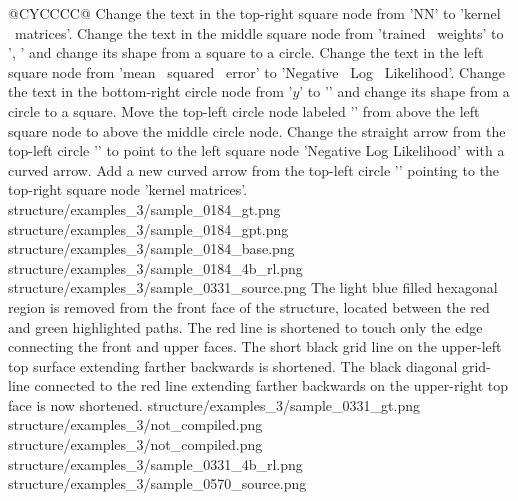 \begin{table}[t]
\begin{tabularx}{\textwidth}{@{}CYCCCC@{}}
    {Change the text in the top-right square node from 'NN' to 'kernel \ matrices'. Change the text in the middle square node from 'trained \ weights' to '\smath{\Theta}, ' and change its shape from a square to a circle. Change the text in the left square node from 'mean \ squared \ error' to 'Negative \ Log \ Likelihood'. Change the text in the bottom-right circle node from '$y$' to '' and change its shape from a circle to a square. Move the top-left circle node labeled '' from above the left square node to above the middle circle node. Change the straight arrow from the top-left circle '' to point to the left square node 'Negative Log Likelihood' with a curved arrow. Add a new curved arrow from the top-left circle '' pointing to the top-right square node 'kernel matrices'.}
    {structure/examples_3/sample_0184_gt.png}
    {structure/examples_3/sample_0184_gpt.png}
    {structure/examples_3/sample_0184_base.png}
    {structure/examples_3/sample_0184_4b_rl.png}
    \midrule
    \exrowthreesix
    {structure/examples_3/sample_0331_source.png}
    {The light blue filled hexagonal region is removed from the front face of the structure, located between the red and green highlighted paths. The red line is shortened to touch only the edge connecting the front and upper faces. The short black grid line on the upper-left top surface extending farther backwards is shortened. The black diagonal grid-line connected to the red line extending farther backwards on the upper-right top face is now shortened.}
    {structure/examples_3/sample_0331_gt.png}
    {structure/examples_3/not_compiled.png}
    {structure/examples_3/not_compiled.png}
    {structure/examples_3/sample_0331_4b_rl.png}
    \midrule
    \exrowthreeseven
    {structure/examples_3/sample_0570_source.png}

\end{tabularx}
\end{table}
